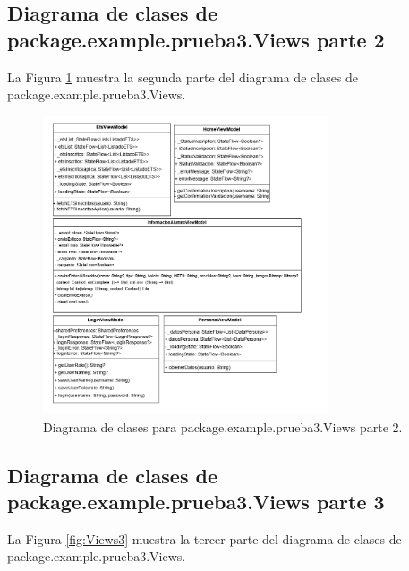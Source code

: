 \newpage

\subsection{Diagrama de clases de package.example.prueba3.Views parte 2}

La Figura \ref{fig:Views2} muestra la segunda parte del diagrama de clases de package.example.prueba3.Views.

\begin{figure}[htbp!]
	\begin{center}
		\includegraphics[width=0.75\textwidth]{DiagramasMoviles/DCM (8)}
		\caption{Diagrama de clases para package.example.prueba3.Views parte 2.}
		\label{fig:Views2}
	\end{center}
\end{figure}

\newpage

\subsection{Diagrama de clases de package.example.prueba3.Views parte 3}

La Figura \ref{fig:Views3} muestra la tercer parte del diagrama de clases de package.example.prueba3.Views.

